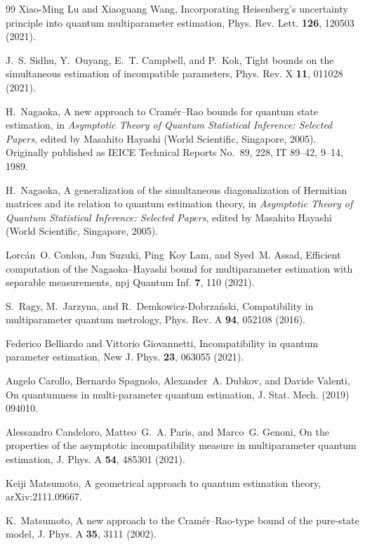 \documentclass[
aps,
prl,
twocolumn,

superscriptaddress]{revtex4-2}
\begin{document}
\begin{thebibliography}{99}
Xiao-Ming Lu and Xiaoguang Wang, Incorporating Heisenberg's uncertainty
principle into quantum multiparameter estimation, Phys. Rev. Lett.
\textbf{126}, 120503 (2021).

J.~S. Sidhu, Y.~Ouyang, E.~T. Campbell, and P.~Kok, Tight bounds on the
simultaneous estimation of incompatible parameters, Phys. Rev. X \textbf{11},
011028 (2021).

H.~Nagaoka, A new approach to Cram{\'e}r--Rao bounds for quantum state
estimation, in \textit{Asymptotic Theory of Quantum Statistical Inference:
Selected Papers}, edited by Masahito Hayashi (World Scientific, Singapore,
2005). Originally published as IEICE Technical Reports No.~89, 228, IT
89--42, 9--14, 1989.

H.~Nagaoka, A generalization of the simultaneous diagonalization of Hermitian
matrices and its relation to quantum estimation theory, in \textit{Asymptotic
Theory of Quantum Statistical Inference: Selected Papers}, edited by Masahito
Hayashi (World Scientific, Singapore, 2005).

Lorc{\'a}n~O. Conlon, Jun Suzuki, Ping~Koy Lam, and Syed~M. Assad, Efficient
computation of the Nagaoka--Hayashi bound for multiparameter estimation with
separable measurements, npj Quantum Inf. \textbf{7}, 110 (2021).

S.~Ragy, M.~Jarzyna, and R.~Demkowicz-Dobrza{\'n}ski, Compatibility in
multiparameter quantum metrology, Phys. Rev. A \textbf{94}, 052108 (2016).

Federico Belliardo and Vittorio Giovannetti, Incompatibility in quantum
parameter estimation, New J. Phys. \textbf{23}, 063055 (2021).

Angelo Carollo, Bernardo Spagnolo, Alexander~A. Dubkov, and Davide Valenti,
On quantumness in multi-parameter quantum estimation, J. Stat. Mech. (2019)
094010.

Alessandro Candeloro, Matteo~G.~A. Paris, and Marco~G. Genoni, On the
properties of the asymptotic incompatibility measure in multiparameter quantum
estimation, J. Phys. A \textbf{54}, 485301 (2021).

Keiji Matsumoto, A geometrical approach to quantum estimation theory,
arXiv:2111.09667.

K.~Matsumoto, A new approach to the Cram{\'e}r--Rao-type bound of the
pure-state model, J. Phys. A \textbf{35}, 3111 (2002).


\end{thebibliography}
\end{document}

